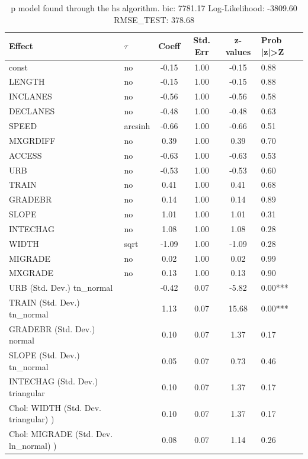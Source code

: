 \begin{table}
	\caption{p model found through the hs algorithm. bic: 7781.17 Log-Likelihood: -3809.60 RMSE_TEST: 378.68}
	\begin{center}
		\begin{tabular}{|l|l|c|c|c|l|}
			\hline
			Effect & $\tau$ & Coeff & Std. Err & z-values & Prob |z|>Z \\
			\hline
			const & no & -0.15 & 1.00 & -0.15 & 0.88 \\
			\hline
			LENGTH & no & -0.15 & 1.00 & -0.15 & 0.88 \\
			\hline
			INCLANES & no & -0.56 & 1.00 & -0.56 & 0.58 \\
			\hline
			DECLANES & no & -0.48 & 1.00 & -0.48 & 0.63 \\
			\hline
			SPEED & arcsinh & -0.66 & 1.00 & -0.66 & 0.51 \\
			\hline
			MXGRDIFF & no & 0.39 & 1.00 & 0.39 & 0.70 \\
			\hline
			ACCESS & no & -0.63 & 1.00 & -0.63 & 0.53 \\
			\hline
			URB & no & -0.53 & 1.00 & -0.53 & 0.60 \\
			\hline
			TRAIN & no & 0.41 & 1.00 & 0.41 & 0.68 \\
			\hline
			GRADEBR & no & 0.14 & 1.00 & 0.14 & 0.89 \\
			\hline
			SLOPE & no & 1.01 & 1.00 & 1.01 & 0.31 \\
			\hline
			INTECHAG & no & 1.08 & 1.00 & 1.08 & 0.28 \\
			\hline
			WIDTH & sqrt & -1.09 & 1.00 & -1.09 & 0.28 \\
			\hline
			MIGRADE & no & 0.02 & 1.00 & 0.02 & 0.99 \\
			\hline
			MXGRADE & no & 0.13 & 1.00 & 0.13 & 0.90 \\
			\hline
			URB (Std. Dev.) tn_normal &  & -0.42 & 0.07 & -5.82 & 0.00*** \\
			\hline
			TRAIN (Std. Dev.) tn_normal &  & 1.13 & 0.07 & 15.68 & 0.00*** \\
			\hline
			GRADEBR (Std. Dev.) normal &  & 0.10 & 0.07 & 1.37 & 0.17 \\
			\hline
			SLOPE (Std. Dev.) tn_normal &  & 0.05 & 0.07 & 0.73 & 0.46 \\
			\hline
			INTECHAG (Std. Dev.) triangular &  & 0.10 & 0.07 & 1.37 & 0.17 \\
			\hline
			 Chol: WIDTH (Std. Dev. triangular) ) &  & 0.10 & 0.07 & 1.37 & 0.17 \\
			\hline
			 Chol: MIGRADE (Std. Dev. ln_normal) ) &  & 0.08 & 0.07 & 1.14 & 0.26 \\

\end{tabular}
\end{center}
\end{table}
